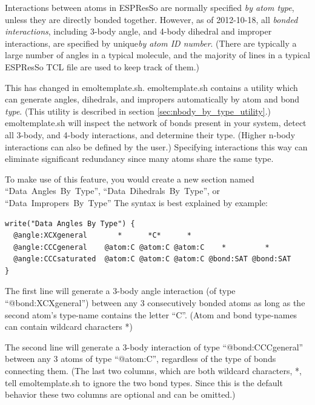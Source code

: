 \documentclass[11pt]{article}
\begin{document}
Interactions between atoms in ESPResSo are normally specified
\textit{by atom type}, unless they are directly bonded together.
However, as of 2012-10-18, all \textit{bonded interactions}, 
including 3-body angle, and 4-body dihedral and improper interactions,
are specified by unique\textit{by atom ID number}.
(There are typically a large number of angles in a typical molecule,
and the majority of lines in a typical ESPResSo TCL file 
are used to keep track of them.)

This has changed in emoltemplate.sh.  emoltemplate.sh contains a 
utility which can generate angles, dihedrals, and impropers
automatically by atom and bond \textit{type}.
(This utility is described in section \ref{sec:nbody_by_type_utility}.)
emoltemplate.sh will inspect the network of bonds present in your system, 
detect all 3-body, and 4-body interactions, and determine their type.
(Higher n-body interactions can also be defined by the user.)
Specifying interactions this way can eliminate significant redundancy 
since many atoms share the same type. 

To make use of this feature, you would create a new section named
\mbox{``Data Angles By Type''}, \mbox{``Data Dihedrals By Type''}, 
or \mbox{``Data Impropers By Type''} 
The syntax is best explained by example:

\begin{verbatim}
write("Data Angles By Type") {
  @angle:XCXgeneral       *      *C*      *
  @angle:CCCgeneral    @atom:C @atom:C @atom:C    *         *
  @angle:CCCsaturated  @atom:C @atom:C @atom:C @bond:SAT @bond:SAT
}
\end{verbatim}

The first line will generate a 3-body angle interaction 
(of type \mbox{``@bond:XCXgeneral''})
between any 3 consecutively bonded atoms 
as long as the second atom's type-name contains the letter ``C''.
(Atom and bond type-names can contain wildcard characters *)

The second line will generate a 3-body interaction 
of type \mbox{``@bond:CCCgeneral''}
between any 3 atoms of type \mbox{``@atom:C''},
regardless of the type of bonds connecting them.
(The last two columns, which are both wildcard characters, *, 
 tell emoltemplate.sh to ignore the two bond types.
 Since this is the default behavior 
 these two columns are optional and can be omitted.)
\end{document}
